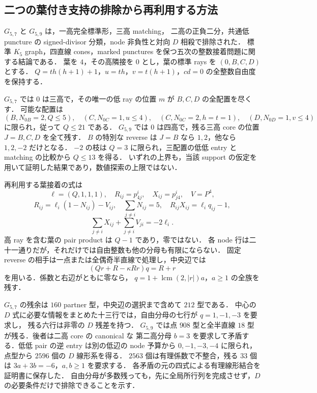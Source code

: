 \subsection{二つの葉付き支持の排除から再利用する方法}
\label{nl19:section}

$G_{5,7}$ と $G_{5,9}$ は，一高完全標準形，三高 matching，
二高の正負二分，共通低 puncture の signed-divisor 分類，node 非負性と対向 $D$ 相殺で排除された．
標準 $K_5$ graph，四直線 cones，marked punctures を保つ五次の整数接着問題に関する結論である．
葉を $4$，その高隣接を $0$ とし，葉の標準 rays を $(0,B,C,D)$ とする．
$Q=th(h+1)+1$，$u=th$，$v=t(h+1)$，$cd=0$ の全整数自由度を保持する．

$G_{5,7}$ では $0$ は三高で，その唯一の低 ray の位置 $m$ が $B,C,D$ の全配置を尽くす．
可能な配置は
\[
 (B,N_{0B}=2,Q\le5),\quad(C,N_{0C}=1,u\le4),\quad
 (C,N_{0C}=2,h=t=1),\quad(D,N_{0D}=1,v\le4)
\]
に限られ，従って $Q\le21$ である．
$G_{5,9}$ では $0$ は四高で，残る三高 core の位置 $J=B,C,D$ を全て残す．
$B$ の特別な reverse は $J=B$ なら $1,2$，他なら $1,2,-2$ だけとなる．
$-2$ の枝は $Q=3$ に限られ，三配置の低低 entry と matching の比較から $Q\le13$ を得る．
いずれの上界も，当該 support の仮定を用いて証明した結果であり，数値探索の上限ではない．

再利用する葉接着の式は
\[
 \ell=(Q,1,1,1),\quad R_{ij}=p^i_{4j},\quad X_{ij}=p^i_{j4},\quad V=P^4,
\]
\[
 R_{ij}=\ell_i(1-N_{ij})-V_{ij},\quad\sum_{j\ne i}N_{ij}=5,\quad
 R_{ij}X_{ij}=\ell_iq_{ij}-1,
\]
\[
 \sum_{j\ne i}X_{ij}+\sum_{j\ne i}V_{ji}=-2\ell_i.
\]
高 ray を含む葉の pair product は $Q-1$ であり，零ではない．
各 node 行は二十一通りだが，それだけでは自由整数も他の分母も有限にならない．
固定 reverse の相手は一点または全偶奇半直線で処理し，中央辺では
\[
 (Qr+R-\kappa Rr)q=R+r
\]
を用いる．係数と右辺がともに零なら，
$q=1+\operatorname{lcm}(2,|r|)a$，$a\ge1$ の全族を残す．

$G_{5,7}$ の残余は $160$ partner 型，中央辺の選択まで含めて $212$ 型である．
中心の $D$ 式に必要な情報をまとめた十三行では，自由分母の七行が $q=1,-1,-3$ を要求し，
残る六行は非零の $D$ 残差を持つ．
$G_{5,9}$ では点 $908$ 型と全半直線 $18$ 型が残る．後者は二高 core の canonical な
第二高分母 $b=3$ を要求して矛盾する．低低 pair の逆 entry は別の低辺の node 予算から
$0,-1,-3,-4$ に限られ，点型から $2596$ 個の $D$ 線形系を得る．
$2563$ 個は有理係数で不整合，残る $33$ 個は $3a+3b=-6$，$a,b\ge1$ を要求する．
各矛盾の元の四式による有理線形結合を証明書に保存した．
自由分母が多数残っても，先に全局所行列を完成させず，$D$ の必要条件だけで排除できることを示す．

